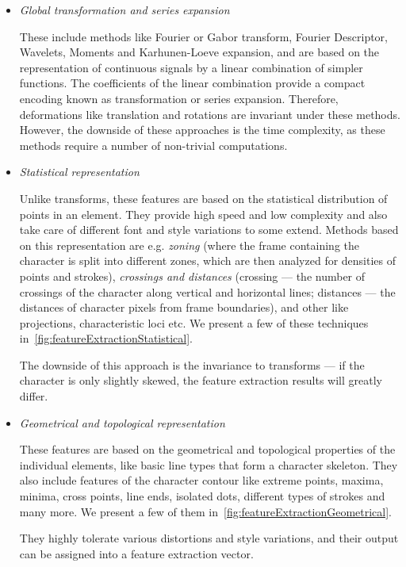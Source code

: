 \begin{itemize}

\item \emph{Global transformation and series expansion}

These include methods like Fourier or Gabor transform, Fourier Descriptor, Wavelets, Moments and Karhunen-Loeve expansion, and are based on the representation of continuous signals by a linear combination of simpler functions. The coefficients of the linear combination provide a compact encoding known as transformation or series expansion. Therefore, deformations like translation and rotations are invariant under these methods. However, the downside of these approaches is the time complexity, as these methods require a number of non-trivial computations.

\item \emph{Statistical representation}

Unlike transforms, these features are based on the statistical distribution of points in an element. They provide high speed and low complexity and also take care of different font and style variations to some extend. Methods based on this representation are e.g. \emph{zoning} (where the frame containing the character is split into different zones, which are then analyzed for densities of points and strokes), \emph{crossings and distances} (crossing --- the number of crossings of the character along vertical and horizontal lines; distances --- the distances of character pixels from frame boundaries), and other like projections, characteristic loci etc. We present a few of these techniques in~\cref{fig:featureExtractionStatistical}.

The downside of this approach is the invariance to transforms --- if the character is only slightly skewed, the feature extraction results will greatly differ.

\item \emph{Geometrical and topological representation}

These features are based on the geometrical and topological properties of the individual elements, like basic line types that form a character skeleton. They also include features of the character contour like extreme points, maxima, minima, cross points, line ends, isolated dots, different types of strokes and many more. We present a few of them in~\cref{fig:featureExtractionGeometrical}.

They highly tolerate various distortions and style variations, and their output can be assigned into a feature extraction vector.

\end{itemize}


